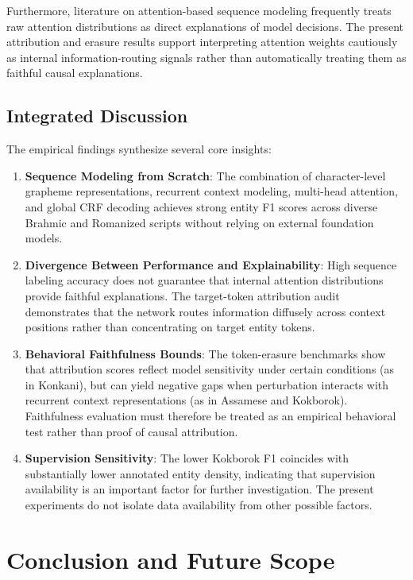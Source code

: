 \documentclass[pdflatex,sn-mathphys-num]{sn-jnl}
\begin{document}
Furthermore, literature on attention-based sequence modeling frequently treats raw attention distributions as direct explanations of model decisions. The present attribution and erasure results support interpreting attention weights cautiously as internal information-routing signals rather than automatically treating them as faithful causal explanations.

\subsection{Integrated Discussion}\label{subsec:integrated_disc}
\enlargethispage{2\baselineskip}

The empirical findings synthesize several core insights:
\begin{enumerate}
    \item \textbf{Sequence Modeling from Scratch}: The combination of character-level grapheme representations, recurrent context modeling, multi-head attention, and global CRF decoding achieves strong entity F1 scores across diverse Brahmic and Romanized scripts without relying on external foundation models.
    \item \textbf{Divergence Between Performance and Explainability}: High sequence labeling accuracy does not guarantee that internal attention distributions provide faithful explanations. The target-token attribution audit demonstrates that the network routes information diffusely across context positions rather than concentrating on target entity tokens.
    \item \textbf{Behavioral Faithfulness Bounds}: The token-erasure benchmarks show that attribution scores reflect model sensitivity under certain conditions (as in Konkani), but can yield negative gaps when perturbation interacts with recurrent context representations (as in Assamese and Kokborok). Faithfulness evaluation must therefore be treated as an empirical behavioral test rather than proof of causal attribution.
    \item \textbf{Supervision Sensitivity}: The lower Kokborok F1 coincides with substantially lower annotated entity density, indicating that supervision availability is an important factor for further investigation. The present experiments do not isolate data availability from other possible factors.
\end{enumerate}

\section{Conclusion and Future Scope}\label{sec:conclusion}
\end{document}
